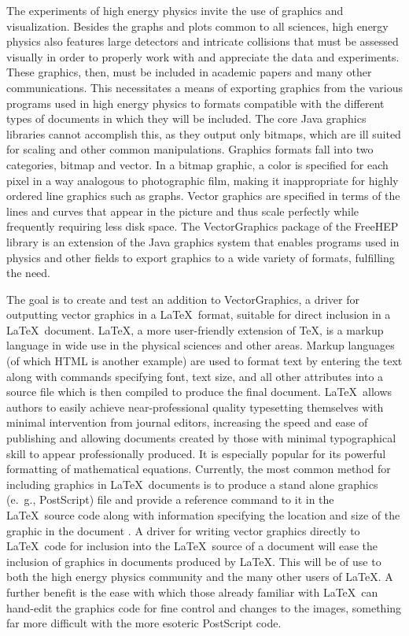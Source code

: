 \documentclass[11pt]{report}
\begin{document}
The experiments of high energy physics invite the use of graphics and visualization. Besides the graphs and plots common to all sciences, high energy physics also features large detectors and intricate collisions that must be assessed visually in order to properly work with and appreciate the data and experiments. These graphics, then, must be included in academic papers and many other communications. This necessitates a means of exporting graphics from the various programs used in high energy physics to formats compatible with the different types of documents in which they will be included. The core Java graphics libraries \cite{java:api} cannot accomplish this, as they output only bitmaps, which are ill suited for scaling and other common manipulations. Graphics formats fall into two categories, bitmap and vector. In a bitmap graphic, a color is specified for each pixel in a way analogous to photographic film, making it inappropriate for highly ordered line graphics such as graphs. Vector graphics are specified in terms of the lines and curves that appear in the picture and thus scale perfectly while frequently requiring less disk space. The VectorGraphics package of the FreeHEP library is an extension of the Java graphics system that enables programs used in physics and other fields to export graphics to a wide variety of formats, fulfilling the need.

The goal is to create and test an addition to VectorGraphics, a driver for outputting vector graphics in a \LaTeX\ format, suitable for direct inclusion in a \LaTeX\ document. \LaTeX, a more user-friendly extension of \TeX, is a markup language in wide use in the physical sciences and other areas. Markup languages (of which HTML is another example) are used to format text by entering the text along with commands specifying font, text size, and all other attributes into a source file which is then compiled to produce the final document. \LaTeX\ allows authors to easily achieve near-professional quality typesetting themselves with minimal intervention from journal editors, increasing the speed and ease of publishing and allowing documents created by those with minimal typographical skill to appear professionally produced. It is especially popular for its powerful formatting of mathematical equations. Currently, the most common method for including graphics in \LaTeX\ documents is to produce a stand alone graphics (e.~g., PostScript) file and provide a reference command to it in the \LaTeX\ source code along with information specifying the location and size of the graphic in the document \cite{kopka, hoenig}. A driver for writing vector graphics directly to \LaTeX\ code for inclusion into the \LaTeX\ source of a document will ease the inclusion of graphics in documents produced by \LaTeX. This will be of use to both the high energy physics community and the many other users of \LaTeX. A further benefit is the ease with which those already familiar with \LaTeX\ can hand-edit the graphics code for fine control and changes to the images, something far more difficult with the more esoteric PostScript code.
\end{document}
